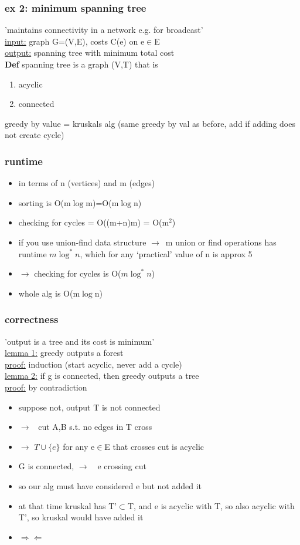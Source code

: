 \documentclass[a4paper]{article}
\newcommand{\bi}{\begin{itemize}}
\newcommand{\ei}{\end{itemize}}
\newcommand{\be}{\begin{enumerate}}
\newcommand{\ee}{\end{enumerate}}
\newcommand{\ra}{$\rightarrow$}
\begin{document}
{      \subsubsection{ex 2: minimum spanning tree}
        'maintains connectivity in a network e.g. for broadcast'\\
        \underline{input:} graph G=(V,E), costs C(e) on e$\in$E\\
        \underline{output:} spanning tree with minimum total cost\\
        \textbf{Def} spanning tree is a graph (V,T) that is
        \be
          \item acyclic
          \item connected
        \ee
        \note greedy by value = kruskals alg (same greedy by val as before, add
        if adding does not create cycle)
      \subsubsection{runtime}
        \bi
          \item in terms of n (vertices) and m (edges)
          \item sorting is O(m$\log$m)=O(m$\log$n)
          \item checking for cycles = O((m+n)m) = O(m$^2$)
          \item[] if you use union-find data structure \ra\ m union or find
          operations has runtime $m\log^*n$, which for any `practical' value of
          n is approx 5
          \item[\ra ] checking for cycles is O($m\log^*n$)
          \item whole alg is O(m$\log$n)
        \ei
      \subsubsection{correctness}
        'output is a tree and its cost is minimum'\\
        \underline{lemma 1:} greedy outputs a forest\\
        \underline{proof:} induction (start acyclic, never add a cycle)\\
        \underline{lemma 2:} if g is connected, then greedy outputs a tree\\
        \underline{proof:} by contradiction
        \bi
          \item suppose not, output T is not connected
          \item[\ra ] \te\ cut A,B s.t. no edges in T cross
          \item[\ra ] $T\cup \{e\}$ for any e$\in$E that crosses cut is acyclic
          \item G is connected, \ra\ \te\ e crossing cut
          \item so our alg must have considered e but not added it
          \item at that time kruskal has T'$\subset$T, and e is acyclic with T,
          so also acyclic with T', so kruskal would have added it
          \item $\Rightarrow\Leftarrow$
        \ei
}
\end{document}
